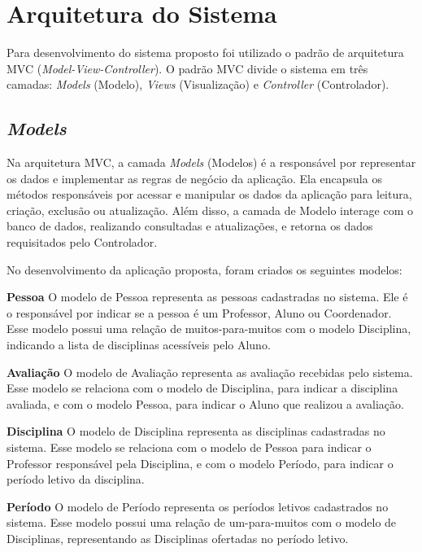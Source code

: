 
\section{Arquitetura do Sistema}

Para desenvolvimento do sistema proposto foi utilizado o padrão de arquitetura MVC (\textit{Model-View-Controller}).  O padrão MVC divide o sistema em três camadas: \textit{Models} (Modelo), \textit{Views} (Visualização) e \textit{Controller} (Controlador).

\subsection{\textit{Models}}

Na arquitetura MVC, a camada \textit{Models} (Modelos) é a responsável por representar os dados e implementar as regras de negócio da aplicação. Ela encapsula os métodos responsáveis por acessar e manipular os dados da aplicação para leitura, criação, exclusão ou atualização. Além disso, a camada de Modelo interage com o banco de dados, realizando consultadas e atualizações, e retorna os dados requisitados pelo Controlador.

No desenvolvimento da aplicação proposta, foram criados os seguintes modelos:

\begin{alineas}
    \item \textbf{Pessoa} O modelo de Pessoa representa as pessoas cadastradas no sistema. Ele é o responsável por indicar se a pessoa é um Professor, Aluno ou Coordenador. Esse modelo possui uma relação de muitos-para-muitos com o modelo Disciplina, indicando a lista de disciplinas acessíveis pelo Aluno. 
    \item \textbf{Avaliação} O modelo de Avaliação representa as avaliação recebidas pelo sistema. Esse modelo se relaciona com o modelo de Disciplina, para indicar a disciplina avaliada, e com o modelo Pessoa, para indicar o Aluno que realizou a avaliação.
    \item \textbf{Disciplina} O modelo de Disciplina representa as disciplinas cadastradas no sistema. Esse modelo se relaciona com o modelo de Pessoa para indicar o Professor responsável pela Disciplina, e com o modelo Período, para indicar o período letivo da disciplina.
    \item \textbf{Período} O modelo de Período representa os períodos letivos cadastrados no sistema. Esse modelo possui uma relação de um-para-muitos com o modelo de Disciplinas, representando as Disciplinas ofertadas no período letivo.
\end{alineas}

